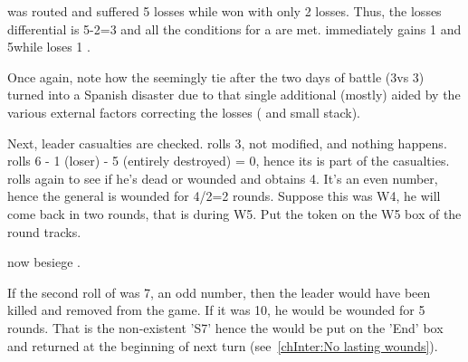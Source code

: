 \begin{exemple}
  \HIS was routed and suffered 5 losses while \FRA won with only 2
  losses. Thus, the losses differential is 5-2=3 and all the conditions for a
   are met. \FRA immediately gains 1 \STAB and 5\VPs while
  \HIS loses 1 \STAB.

  Once again, note how the seemingly tie after the two days of battle
  (3\textetoile\textetoile\textetoile vs 3\textetoile\textetoile) turned into a
  Spanish disaster due to that single additional \textetoile (mostly) aided by
  the various external factors correcting the losses ( and small stack).

  Next, leader casualties are checked. \FRA rolls 3, not modified, and nothing
  happens. \HIS rolls 6 - 1 (loser) - 5 (entirely destroyed) = 0, hence its
  \LeaderG is part of the casualties. \HIS rolls again to see if he's dead or
  wounded and obtains 4. It's an even number, hence the general is wounded for
  4/2=2 rounds. Suppose this was W4, he will come back in two rounds, that is
  during W5. Put the token on the W5 box of the round tracks.

  \FRA now besiege \villeArras.

  \smallskip

  If the second roll of \HIS was 7, an odd number, then the leader would have
  been killed and removed from the game. If it was 10, he would be wounded for
  5 rounds. That is the non-existent 'S7' hence the \LeaderG would be put on
  the 'End' box and returned at the beginning of next turn
  (see~\ref{chInter:No lasting wounds}).
\end{exemple}

